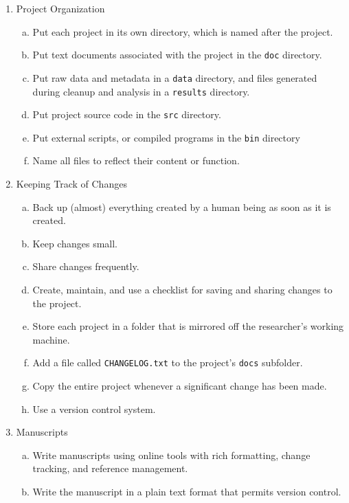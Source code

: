 \documentclass[10pt,letterpaper]{article}
\begin{document}
{\begin{enumerate}
\item Project Organization
  \begin{enumerate}[a)]
  \item Put each project in its own directory, which is named after the project.
  \item Put text documents associated with the project in the \texttt{doc} directory.
  \item Put raw data and metadata in a \texttt{data} directory, and files generated during cleanup and analysis in a \texttt{results} directory.
  \item Put project source code in the \texttt{src} directory.
  \item Put external scripts, or compiled programs in the \texttt{bin} directory
  \item Name all files to reflect their content or function.
  \end{enumerate}

\item Keeping Track of Changes
  \begin{enumerate}[a)]
  \item Back up (almost) everything created by a human being as soon as it is created.
  \item Keep changes small.
  \item Share changes frequently.
  \item Create, maintain, and use a checklist for saving and sharing changes to the project.
  \item Store each project in a folder that is mirrored off the researcher's working machine.
  \item Add a file called \texttt{CHANGELOG.txt} to the project's \texttt{docs} subfolder.
  \item Copy the entire project whenever a significant change has been made.
  \item Use a version control system.
  \end{enumerate}

\item Manuscripts
  \begin{enumerate}[a)]
  \item Write manuscripts using online tools with rich formatting, change tracking, and reference management.
  \item Write the manuscript in a plain text format that permits version control.
  \end{enumerate}
\end{enumerate}
}
\end{document}
